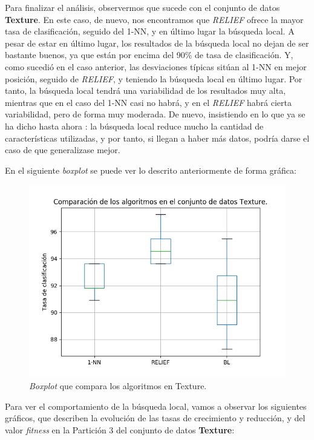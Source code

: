 \documentclass[11pt,a4paper]{article}
\begin{document}
Para finalizar el análisis, observermos que sucede con el conjunto de datos \textbf{Texture}. En este caso, de nuevo, nos
encontramos que \textit{RELIEF} ofrece la mayor tasa de clasificación, seguido del 1-NN, y en último lugar la búsqueda local.
A pesar de estar en último lugar, los resultados de la búsqueda local no dejan de ser bastante buenos, ya que están por
encima del 90\% de tasa de clasificación. Y, como sucedió en el caso anterior, las desviaciones típicas sitúan al 1-NN
en mejor posición, seguido de \textit{RELIEF}, y teniendo la búsqueda local en último lugar. Por tanto, la búsqueda local
tendrá una variabilidad de los resultados muy alta, mientras que en el caso del 1-NN casi no habrá, y en el \textit{RELIEF}
habrá cierta variabilidad, pero de forma muy moderada. De nuevo, insistiendo en lo que ya se ha dicho hasta ahora : la
búsqueda local reduce mucho la cantidad de características utilizadas, y por tanto, si llegan a haber más datos, podría darse
el caso de que generalizase mejor.

En el siguiente \textit{boxplot} se puede ver lo descrito anteriormente de forma gráfica:

\begin{figure}[H]
\centering
\includegraphics[scale=0.8]{img/box_texture.png}
\caption{\textit{Boxplot} que compara los algoritmos en Texture.}
\end{figure}

Para ver el comportamiento de la búsqueda local, vamos a observar los siguientes gráficos, que describen la evolución de
las tasas de crecimiento y reducción, y del valor \textit{fitness} en la Partición 3 del conjunto de datos \textbf{Texture}:
\end{document}
